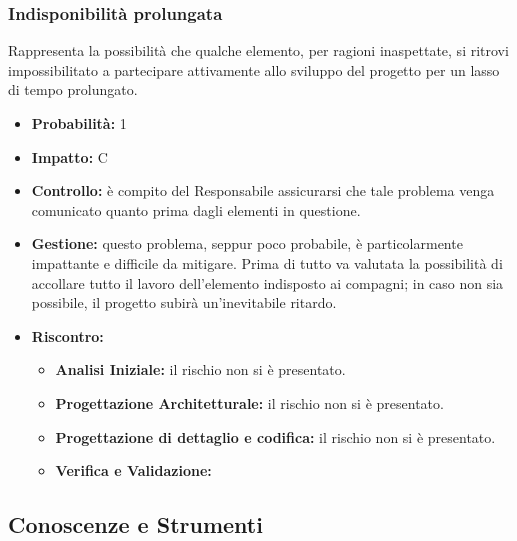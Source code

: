 \documentclass[a4paper,11pt]{article}
\begin{document}
		\subsubsection{Indisponibilità prolungata}
		Rappresenta la possibilità che qualche elemento, per ragioni inaspettate, si ritrovi impossibilitato a partecipare attivamente allo sviluppo del progetto per un lasso di tempo prolungato. 
		\begin{itemize}
		\item \textbf{Probabilità: }1
		\item \textbf{Impatto: }C
		\item \textbf{Controllo:} è compito del Responsabile assicurarsi che tale problema venga comunicato quanto prima dagli elementi in questione.
		\item \textbf{Gestione:} questo problema, seppur poco probabile, è particolarmente impattante e difficile da mitigare. Prima di tutto va valutata la possibilità di accollare tutto il lavoro dell'elemento indisposto ai compagni; in caso non sia possibile, il progetto subirà un'inevitabile ritardo.
		\item \textbf{Riscontro:}
			\begin{itemize}
				\item\textbf{Analisi Iniziale:} il rischio non si è presentato.
				\item\textbf{Progettazione Architetturale:} il rischio non si è presentato.
				\item\textbf{Progettazione di dettaglio e codifica:} il rischio non si è presentato.
				\item\textbf{Verifica e Validazione:}
			\end{itemize}
		\end{itemize}
	\subsection{Conoscenze e Strumenti} \label{risk:conoscenze }
\end{document}
